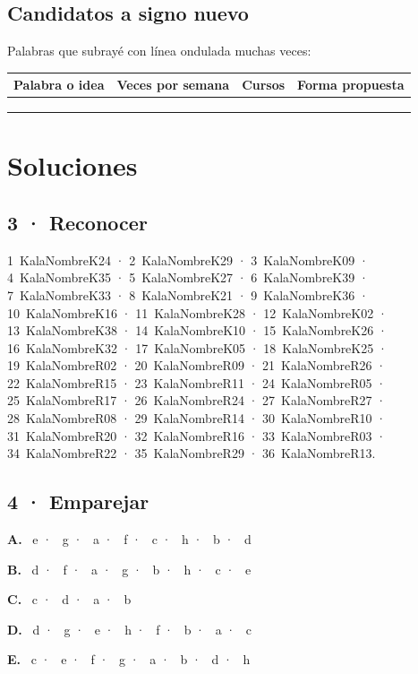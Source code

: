 \documentclass[11pt,a4paper]{article}
\newcommand{\Sol}[1]{\textbf{#1}}
\begin{document}
\subsection*{Candidatos a signo nuevo}
Palabras que subrayé con línea ondulada muchas veces:
\begin{center}
\begin{tabular}{@{}p{45mm}>{\raggedright\arraybackslash}p{25mm}p{35mm}p{35mm}@{}}
\toprule Palabra o idea & Veces por semana & Cursos & Forma propuesta \\ \midrule
\rule{0pt}{11mm} & & & \\ \hline
\rule{0pt}{11mm} & & & \\ \hline
\rule{0pt}{11mm} & & & \\ \bottomrule
\end{tabular}
\end{center}

\clearpage
\section*{Soluciones}

\subsection*{3 · Reconocer}
\newcommand{\Nom}[1]{\csname KalaNombre#1\endcsname}
{\small
1~\Nom{K24} · 2~\Nom{K29} · 3~\Nom{K09} · 4~\Nom{K35} · 5~\Nom{K27} · 6~\Nom{K39} ·
7~\Nom{K33} · 8~\Nom{K21} · 9~\Nom{K36} · 10~\Nom{K16} · 11~\Nom{K28} · 12~\Nom{K02} ·
13~\Nom{K38} · 14~\Nom{K10} · 15~\Nom{K26} · 16~\Nom{K32} · 17~\Nom{K05} · 18~\Nom{K25} ·
19~\Nom{R02} · 20~\Nom{R09} · 21~\Nom{R26} · 22~\Nom{R15} · 23~\Nom{R11} · 24~\Nom{R05} ·
25~\Nom{R17} · 26~\Nom{R24} · 27~\Nom{R27} · 28~\Nom{R08} · 29~\Nom{R14} · 30~\Nom{R10} ·
31~\Nom{R20} · 32~\Nom{R16} · 33~\Nom{R03} · 34~\Nom{R22} · 35~\Nom{R29} · 36~\Nom{R13}.}

\subsection*{4 · Emparejar}
{\small
\Sol{A.} ~e · ~g · ~a · ~f · ~c · ~h · ~b · ~d\par
\Sol{B.} ~d · ~f · ~a · ~g · ~b · ~h · ~c · ~e\par
\Sol{C.} ~c · ~d · ~a · ~b\par
\Sol{D.} ~d · ~g · ~e · ~h · ~f · ~b · ~a · ~c\par
\Sol{E.} ~c · ~e · ~f · ~g · ~a · ~b · ~d · ~h\par}
\end{document}
